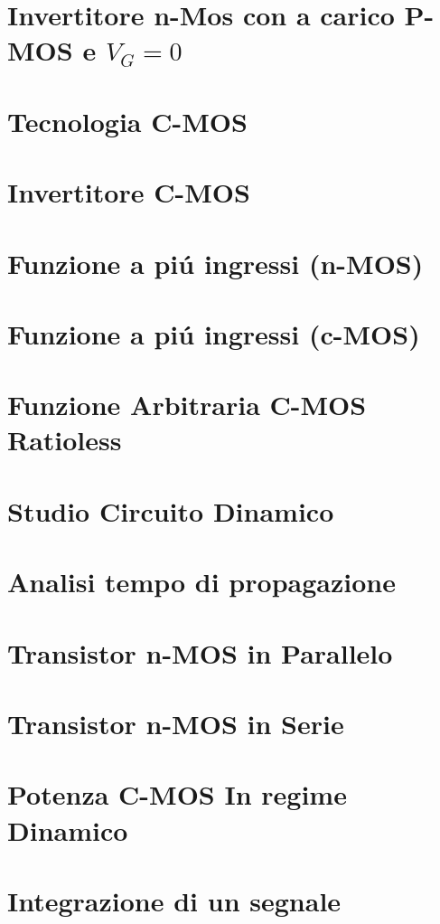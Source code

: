 \documentclass{article}
\begin{document}
\section{Invertitore n-Mos con a carico P-MOS e $V_G = 0$}
\section{Tecnologia C-MOS}
\section{Invertitore C-MOS}
\section{Funzione a pi\'u ingressi (n-MOS)}
\section{Funzione a pi\'u ingressi (c-MOS)}
\section{Funzione Arbitraria C-MOS Ratioless}
\section{Studio Circuito Dinamico}
\section{Analisi tempo di propagazione}
\section{Transistor n-MOS in Parallelo}
\section{Transistor n-MOS in Serie}
\section{Potenza C-MOS In regime Dinamico}
% 
% 



% 




\section{Integrazione di un segnale}
\end{document}
